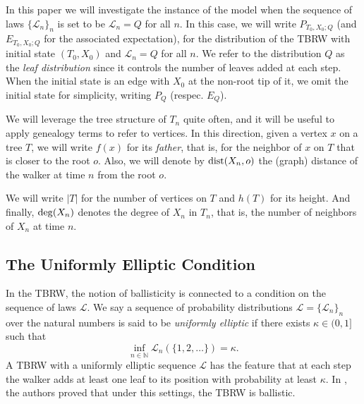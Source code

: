 \documentclass[a4paper]{amsart}
\newcommand{\Law}{\mathcal{L}}
\newcommand{\D}[1]{{\rm dist}(X_{#1},o)}
\newcommand{\Deg}[1]{{\rm deg}(X_{#1})}
\begin{document}
In this paper we will investigate the instance of the model when the sequence of laws $\{\Law_n\}_n$ is set to be $\Law_n = Q$ for all $n$. In this case, we will write $P_{T_0,X_0; Q}$ (and $E_{T_0,X_0;Q}$ for the associated expectation), for the distribution of the TBRW with initial state $(T_0,X_0)$ and $\Law_n = Q$ for all $n$. We refer to the distribution $Q$ as the {\it leaf distribution} since it controls the number of leaves added at each step. When the initial state is an edge with $X_0$ at the non-root tip of it, we omit the initial state for simplicity, writing $P_Q$ (respec. $E_Q$). 

We will leverage the tree structure of $T_n$ quite often, and it will be useful to apply genealogy terms to refer to vertices. In this direction, given a vertex $x$ on a tree $T$, we will write $f(x)$ for its {\it father}, that is, for the neighbor of $x$ on $T$ that is closer to the root $o$. Also, we will denote by $\D{n}$ the (graph) distance of the walker at time $n$ from the root $o$.

We will write $|T|$ for the number of vertices on $T$ and $h(T)$ for its height. And finally, $\Deg{n}$ denotes the degree of $X_n$ in $T_n$, that is, the number of neighbors of $X_n$ at time $n$.

\subsection{The Uniformly Elliptic Condition}
In the TBRW, the notion of ballisticity is connected to a condition on the sequence of laws $\Law$. We say a sequence of probability distributions $\Law = \{\Law_n\}_n$ over the natural numbers is said to be {\it uniformly elliptic} if there exists $\kappa \in (0,1]$ such that
\begin{equation}\label{eq:ue}
    \inf_{n \in \mathbb{N}}\Law_n(\{1,2,\dots\}) = \kappa.
\end{equation}
A TBRW with a uniformly elliptic sequence $\Law$ has the feature that at each step the walker adds at least one leaf to its position with probability at least $\kappa$. In \cite{IRVZ22}, the authors proved that under this settings, the TBRW is ballistic.
\end{document}
